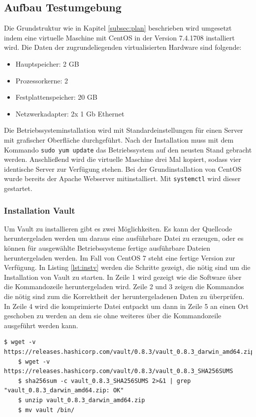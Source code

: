 \documentclass[
book,
a4paper,   
titlepage,  
halfparskip,
12pt        
]{scrartcl}
\newcommand\inline{\lstinline[basicstyle=\ttfamily]}
\begin{document}
\begin{onehalfspacing}
\subsection{Aufbau Testumgebung}
Die Grundstruktur wie in Kapitel \vref{subsec:plan} beschrieben wird umgesetzt indem eine virtuelle Maschine mit CentOS in der Version 7.4.1708 installiert wird. Die Daten der zugrundeliegenden virtualisierten Hardware sind folgende:
\begin{itemize}
	\item Hauptspeicher: 2 GB
	\item Prozessorkerne: 2
	\item Festplattenspeicher: 20 GB
	\item Netzwerkadapter: 2x 1 Gb Ethernet
\end{itemize} 
Die Betriebssysteminstallation wird mit Standardeinstellungen für einen Server mit grafischer Oberfläche durchgeführt. Nach der Installation muss mit dem Kommando \inline|sudo yum update| das Betriebssystem auf den neusten Stand gebracht werden. Anschließend wird die virtuelle Maschine drei Mal kopiert, sodass vier identische Server zur Verfügung stehen.\newline
Bei der Grundinstallation von CentOS wurde bereits der Apache Webserver mitinstalliert. Mit \inline|systemctl| wird dieser gestartet.
\subsubsection{Installation Vault}
\label{subsubsec:instv}
Um Vault zu installieren gibt es zwei Möglichkeiten. Es kann der Quellcode heruntergeladen werden um daraus eine ausführbare Datei zu erzeugen, oder es können für ausgewählte Betriebssysteme fertige ausführbare Dateien heruntergeladen werden. Im Fall von CentOS 7 steht eine fertige Version zur Verfügung. In Listing \vref{lst:instv} werden die Schritte gezeigt, die nötig sind um die Installation von Vault zu starten. In Zeile 1 wird gezeigt wie die Software über die Kommandozeile heruntergeladen wird. Zeile 2 und 3 zeigen die Kommandos die nötig sind zum die Korrektheit der heruntergeladenen Daten zu überprüfen. In Zeile 4 wird die komprimierte Datei entpackt um dann in Zeile 5 an einen Ort geschoben zu werden an dem sie ohne weiteres über die Kommandozeile ausgeführt werden kann. 

\begin{lstlisting}[caption={[Installation Vault] Schritte die zur Installation von Vault notwendig sind}, label=lst:instv, captionpos=b, basicstyle=\ttfamily]
	$ wget -v https://releases.hashicorp.com/vault/0.8.3/vault_0.8.3_darwin_amd64.zip
	$ wget -v https://releases.hashicorp.com/vault/0.8.3/vault_0.8.3_SHA256SUMS
	$ sha256sum -c vault_0.8.3_SHA256SUMS 2>&1 | grep "vault_0.8.3_darwin_amd64.zip: OK"
	$ unzip vault_0.8.3_darwin_amd64.zip
	$ mv vault /bin/
\end{lstlisting}


\end{onehalfspacing}
\end{document}
